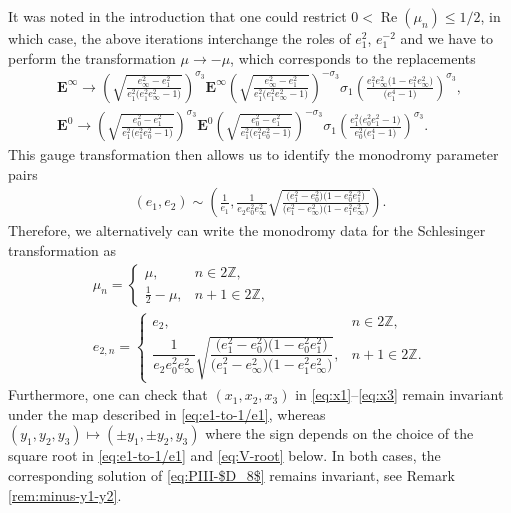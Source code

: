 \documentclass[pdftex]{sigma}
\numberwithin{equation}{section}
\newcommand{\Z}{{\mathbb{Z}}}
\newcommand{\re}{\operatorname{Re}}
\begin{document}
\begin{Remark}
\label{remark:e2-mu-minus-mu-change}
It was noted in the introduction that one could restrict $0 < \re(\mu_n) \leq 1/2$, in which case, the above iterations interchange the roles of $e_1^2$, $e_1^{-2}$ and we have to perform the transformation $\mu\to -\mu$, which corresponds to the replacements
\begin{gather*}
\mathbf{E}^\infty\to \left(\sqrt{\frac{e_\infty^2-e_1^2}{e_1^2\big(e_1^2e_\infty^2-1\big)}}\right)^{\sigma_3}\mathbf{E}^\infty\left(\sqrt{\frac{e_\infty^2-e_1^2}{e_1^2\big(e_1^2e_\infty^2-1\big)}}\right)^{-\sigma_3}\sigma_1\left(\frac{e_1^2 e_\infty^2 \big(1-e_1^2 e_\infty^2\big)}{ \big(e_1^4-1\big)}\right)^{\sigma_3},\\
\mathbf{E}^0\to \left(\sqrt{\frac{e_0^2-e_1^2}{e_1^2\big(e_1^2e_0^2-1\big)}}\right)^{\sigma_3}\mathbf{E}^0\left(\sqrt{\frac{e_0^2-e_1^2}{e_1^2\big(e_1^2e_0^2-1\big)}}\right)^{-\sigma_3}\sigma_1\left(\frac{e_1^2 \big(e_0^2 e_1^2-1\big)}{ e_0^2 \big(e_1^4-1\big)}\right)^{\sigma_3}.
\end{gather*}
This gauge transformation then allows us to identify the monodromy parameter pairs
\begin{gather}
(e_1,e_2)\sim \left(\frac{1}{e_1},\frac{1}{e_2e_0^2e_\infty^2}\sqrt{\frac{\big(e_1^2-e_0^2\big)\big(1-e_0^2e_1^2\big)}{\big(e_1^2-e_\infty^2\big)\big(1-e_1^2e_\infty^2\big)}}\right).
\label{eq:e1-to-1/e1}
\end{gather}
Therefore, we alternatively can write the monodromy data for the Schlesinger transformation as
\begin{gather*}
\mu_n = \begin{cases} \mu, & n \in 2\Z, \\ \frac{1}{2}-\mu, & n +1 \in 2\Z, \end{cases} \\
 e_{2,n}=\begin{cases} e_2, & n \in 2\Z, \\ \dfrac{1}{e_2e_0^2e_\infty^2}\sqrt{\dfrac{\big(e_1^2-e_0^2\big)\big(1-e_0^2e_1^2\big)}{\big(e_1^2-e_\infty^2\big)\big(1-e_1^2e_\infty^2\big)}}, & n +1 \in 2\Z. \end{cases}
\end{gather*}
Furthermore, one can check that $(x_1, x_2, x_3)$ in \eqref{eq:x1}--\eqref{eq:x3} remain invariant under the map described in \eqref{eq:e1-to-1/e1}, whereas $(y_1, y_2, y_3) \mapsto (\pm y_1, \pm y_2, y_3)$ where the sign depends on the choice of the square root in \eqref{eq:e1-to-1/e1} and \eqref{eq:V-root} below. In both cases, the corresponding solution of \eqref{eq:PIII-$D_8$} remains invariant, see Remark \ref{rem:minus-y1-y2}.
\end{Remark}
\end{document}
